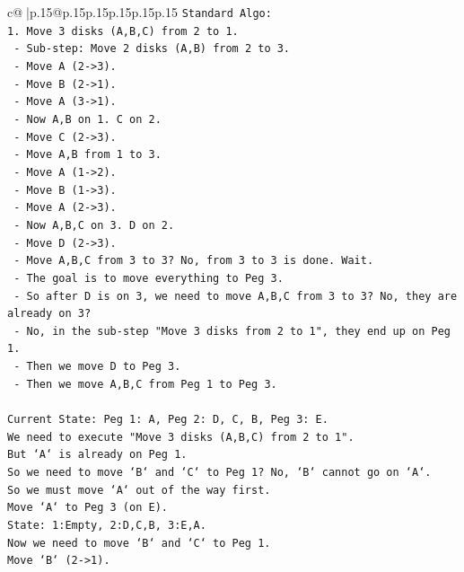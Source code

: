 \documentclass{article}
\begin{document}
{\begin{supertabular}{c@{$\;$}|p{.15\linewidth}@{}p{.15\linewidth}p{.15\linewidth}p{.15\linewidth}p{.15\linewidth}p{.15\linewidth}}
{{{\texttt{Standard Algo:} \\
\texttt{1. Move 3 disks (A,B,C) from 2 to 1.} \\
\texttt{   {-} Sub{-}step: Move 2 disks (A,B) from 2 to 3.} \\
\texttt{     {-} Move A (2{-}>3).} \\
\texttt{     {-} Move B (2{-}>1).} \\
\texttt{     {-} Move A (3{-}>1).} \\
\texttt{   {-} Now A,B on 1. C on 2.} \\
\texttt{   {-} Move C (2{-}>3).} \\
\texttt{   {-} Move A,B from 1 to 3.} \\
\texttt{     {-} Move A (1{-}>2).} \\
\texttt{     {-} Move B (1{-}>3).} \\
\texttt{     {-} Move A (2{-}>3).} \\
\texttt{   {-} Now A,B,C on 3. D on 2.} \\
\texttt{   {-} Move D (2{-}>3).} \\
\texttt{   {-} Move A,B,C from 3 to 3? No, from 3 to 3 is done. Wait.} \\
\texttt{   {-} The goal is to move everything to Peg 3.} \\
\texttt{   {-} So after D is on 3, we need to move A,B,C from 3 to 3? No, they are already on 3?} \\
\texttt{   {-} No, in the sub{-}step "Move 3 disks from 2 to 1", they end up on Peg 1.} \\
\texttt{   {-} Then we move D to Peg 3.} \\
\texttt{   {-} Then we move A,B,C from Peg 1 to Peg 3.} \\
\\ 
\texttt{Current State: Peg 1: A, Peg 2: D, C, B, Peg 3: E.} \\
\texttt{We need to execute "Move 3 disks (A,B,C) from 2 to 1".} \\
\texttt{But `A` is already on Peg 1.} \\
\texttt{So we need to move `B` and `C` to Peg 1? No, `B` cannot go on `A`.} \\
\texttt{So we must move `A` out of the way first.} \\
\texttt{Move `A` to Peg 3 (on E).} \\
\texttt{State: 1:Empty, 2:D,C,B, 3:E,A.} \\
\texttt{Now we need to move `B` and `C` to Peg 1.} \\
\texttt{Move `B` (2{-}>1).} \\
}}}
\end{supertabular}}
\end{document}
